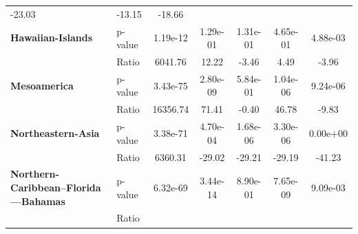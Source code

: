 \begin{table}[H]
{\begin{tabular}{llccccc}
            -23.03
                                                                & -13.15   &
            -18.66
            \\
            \textbf{Hawaiian-Islands}                           & p-value  &
            1.19e-12                                            & 1.29e-01 &
            1.31e-01                                            & 4.65e-01 &
            4.88e-03
            \\
            \textbf{}                                           & Ratio    &
            6041.76                                             & 12.22    &
            -3.46
                                                                & 4.49     &
            -3.96
            \\
            \textbf{Mesoamerica}                                & p-value  &
            3.43e-75                                            & 2.80e-09 &
            5.84e-01                                            & 1.04e-06 &
            9.24e-06
            \\
            \textbf{}                                           & Ratio    &
            16356.74                                            & 71.41    &
            -0.40
                                                                & 46.78    &
            -9.83
            \\
            \textbf{Northeastern-Asia}                          & p-value  &
            3.38e-71                                            & 4.70e-04 &
            1.68e-06                                            & 3.30e-06 &
            0.00e+00
            \\
            \textbf{}                                           & Ratio    &
            6360.31                                             & -29.02   &
            -29.21
                                                                & -29.19   &
            -41.23
            \\
            \textbf{Northern-Caribbean--Florida---Bahamas}      &
            p-value                                             &
            6.32e-69                                            &
            3.44e-14                                            &
            8.90e-01                                            &
            7.65e-09                                            &
            9.09e-03
            \\
            \textbf{}                                           & Ratio    &

\end{tabular}}
\end{table}
